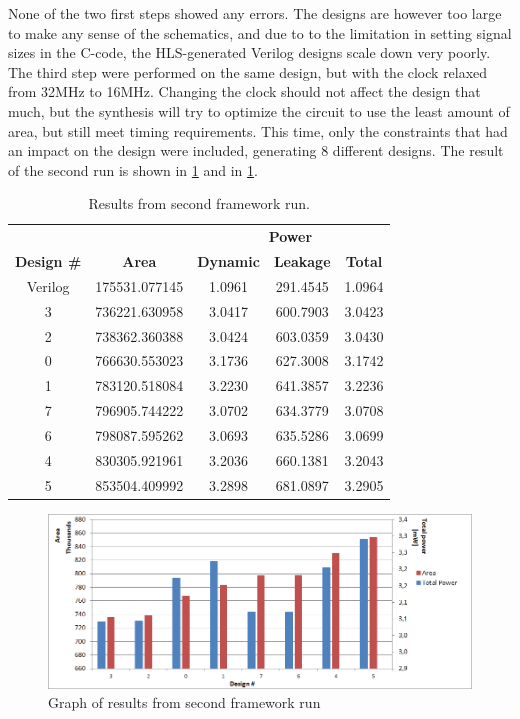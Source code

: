 None of the two first steps showed any errors. The designs are however too large to make any sense of the schematics, and due to to the limitation in setting signal sizes in the C-code, the HLS-generated Verilog designs scale down very poorly. The third step were performed on the same design, but with the clock relaxed from 32MHz to 16MHz. Changing the clock should not affect the design that much, but the synthesis will try to optimize the circuit to use the least amount of area, but still meet timing requirements. This time, only the constraints that had an impact on the design were included, generating 8 different designs. The result of the second run is shown in \cref{tab:resultgraphframeworkrun2} and in \cref{fig:resultgraphframeworkrun2}.
\begin{table}[hbtp]
    \centering
    \begin{tabular}{ccccc}
    & & \multicolumn{3}{c}{\textbf{Power}} \\
    \cline{3-5}
    \textbf{Design \#} & \textbf{Area} & \textbf{Dynamic} & \textbf{Leakage} & \textbf{Total} \\
    \toprule
    Verilog & 175531.077145 & 1.0961 & 291.4545 & 1.0964 \\
    3 & 736221.630958 & 3.0417 & 600.7903 & 3.0423 \\
    2 & 738362.360388 & 3.0424 & 603.0359 & 3.0430 \\
    0 & 766630.553023 & 3.1736 & 627.3008 & 3.1742 \\
    1 & 783120.518084 & 3.2230 & 641.3857 & 3.2236 \\
    7 & 796905.744222 & 3.0702 & 634.3779 & 3.0708 \\
    6 & 798087.595262 & 3.0693 & 635.5286 & 3.0699 \\
    4 & 830305.921961 & 3.2036 & 660.1381 & 3.2043 \\
    5 & 853504.409992 & 3.2898 & 681.0897 & 3.2905 \\

    \bottomrule
    \end{tabular}
    \caption{Results from second framework run.}
    \label{tab:resultgraphframeworkrun2}
\end{table}

\begin{figure}[hbpt]
\centering
\includegraphics[width=\textwidth]{../figs/resultGraph2.png}
\caption{\label{fig:resultgraphframeworkrun2}Graph of results from second framework run}
\end{figure}

